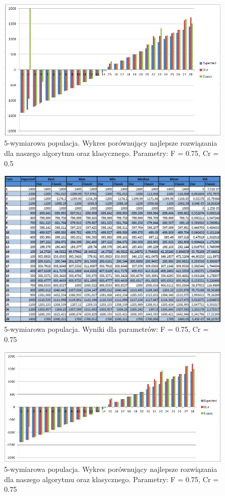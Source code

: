 \documentclass[a4paper]{article}
\begin{document}
\begin{figure}
\centering
\includegraphics[width=\textwidth]{F75Cr5L5chart.png}
\caption{5-wymiarowa populacja. Wykres porównujący najlepsze rozwiązania dla naszego algorytmu oraz klasycznego. Parametry: F = 0.75, Cr = 0.5}
\end{figure}

\begin{figure}
\centering
\includegraphics[width=\textwidth]{F75Cr75L5tab.png}
\caption{5-wymiarowa populacja. Wyniki dla parametrów: F = 0.75, Cr = 0.75}
\end{figure}

\begin{figure}
\centering
\includegraphics[width=\textwidth]{F75Cr75L5chart.png}
\caption{5-wymiarowa populacja. Wykres porównujący najlepsze rozwiązania dla naszego algorytmu oraz klasycznego. Parametry: F = 0.75, Cr = 0.75}
\end{figure}
\end{document}
